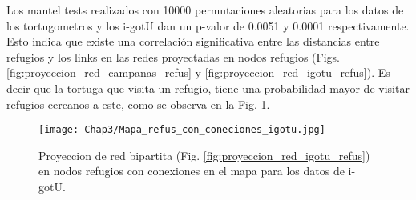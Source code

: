 Los mantel tests realizados con 10000 permutaciones aleatorias para los datos de los tortugometros y los i-gotU dan un p-valor de 0.0051 y 0.0001 respectivamente. Esto indica que existe una correlación significativa entre las distancias entre refugios y los links en las redes proyectadas en nodos refugios (Figs. \ref{fig:proyeccion_red_campanas_refus} y \ref{fig:proyeccion_red_igotu_refus}). Es decir que la tortuga que visita un refugio, tiene una probabilidad mayor de visitar refugios cercanos a este, como se observa en la Fig. \ref{fig:mapa_con_conexiones_igotu}.

\begin{figure}[ht]
    \begin{center}
        \texttt{[image: Chap3/Mapa\_refus\_con\_coneciones\_igotu.jpg]}
        \caption[Proyeccion en nodos refugios con conexiones en el mapa.]{Proyeccion de red bipartita (Fig. \ref{fig:proyeccion_red_igotu_refus}) en nodos refugios con conexiones en el mapa para los datos de i-gotU. } 
        \label{fig:mapa_con_conexiones_igotu}
        
        \end{center}
\end{figure} 

